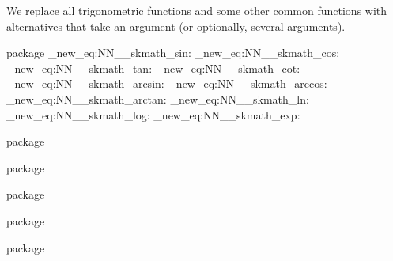 \documentclass[commonsets,load]{skdoc}
\begin{document}
  We replace all trigonometric functions and some other
  common functions with alternatives that take an argument
  (or optionally, several arguments).
\begin{MacroCode}{package}
\cs_new_eq:NN\__skmath_sin:\sin
\cs_new_eq:NN\__skmath_cos:\cos
\cs_new_eq:NN\__skmath_tan:\tan
\cs_new_eq:NN\__skmath_cot:\cot
\cs_new_eq:NN\__skmath_arcsin:\arcsin
\cs_new_eq:NN\__skmath_arccos:\arccos
\cs_new_eq:NN\__skmath_arctan:\arctan
\cs_new_eq:NN\__skmath_ln:\log
\cs_new_eq:NN\__skmath_log:\log
\cs_new_eq:NN\__skmath_exp:\exp
\end{MacroCode}
  \begin{macro}{\sin}
\begin{MacroCode}{package}
\RenewDocumentCommand{}
\end{MacroCode}
  \end{macro}
  \begin{macro}{\cos}
\begin{MacroCode}{package}
\RenewDocumentCommand{}
\end{MacroCode}
  \end{macro}
  \begin{macro}{\tan}
\begin{MacroCode}{package}
\RenewDocumentCommand{}
\end{MacroCode}
  \end{macro}
  \begin{macro}{\cot}
\begin{MacroCode}{package}
\RenewDocumentCommand{}
\end{MacroCode}
  \end{macro}
  \begin{macro}{\arcsin}
\begin{MacroCode}{package}
\RenewDocumentCommand{}
\end{MacroCode}
  \end{macro}
\end{document}
